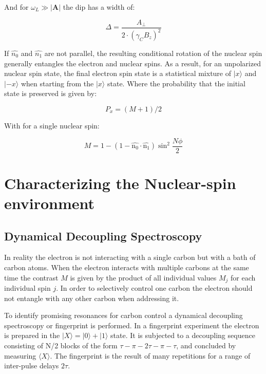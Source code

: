 And for $\omega_L \gg |\bm{A}|$ the dip has a width of:

 \begin{equation}
\Delta = \frac{A_\perp}{2\cdot (\gamma_C B_z)^2}
\label{eq:res_dip_width}
\end{equation}

If  $\hat{n_0}$ and $\hat{n_1}$ are not parallel, the resulting conditional rotation of the nuclear spin generally entangles the electron and nuclear spins. As a result, for an unpolarized nuclear spin state, the final electron spin state is a statistical mixture of $|x\rangle$ and $|-x\rangle$ when starting from the $|x\rangle$  state. Where the probability that the initial state is preserved is given by:

\begin{equation}
P_x = (M+1)/2
\end{equation}

With for a single nuclear spin:

\begin{equation}
M = 1-(1 - \hat{\bm{\mathrm{n_0}}} \cdot \hat{\bm{\mathrm{n_1}}}) \sin^2 \frac{N\phi}{2}
\end{equation}

\section{Characterizing the Nuclear-spin environment}
\subsection*{Dynamical Decoupling Spectroscopy}
In reality the electron is not interacting with a single carbon but with a bath of carbon atoms. When the electron interacts with multiple carbons at the same time the contrast $M$ is given by the product of all individual values $M_j$ for each individual spin $j$. In order to selectively control one carbon the electron should not entangle with any other carbon when addressing it.

To identify promising resonances for carbon control a dynamical decoupling spectroscopy\citep{Taminiau2012Detection} or fingerprint is performed. In a fingerprint experiment the electron is prepared in the $|X\rangle = |0\rangle +|1\rangle$ state. It is subjected to a decoupling sequence consisting of N/2 blocks of the form {$\tau - \pi -2\tau-\pi-\tau$}, and concluded by measuring $\langle X\rangle $. The fingerprint is the result of many repetitions for a range of inter-pulse delays $2\tau$.

